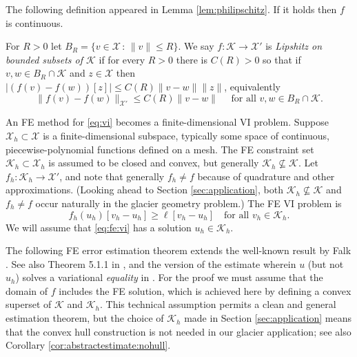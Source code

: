 \documentclass[hidelinks,onefignum,onetabnum,final]{siamart220329}  %
\newcommand{\cK}{\mathcal{K}}
\newcommand{\cX}{\mathcal{X}}
\begin{document}
The following definition appeared in Lemma \ref{lem:philipschitz}.  If it holds then $f$ is continuous.

\begin{definition} \label{def:lipshitz}
For $R>0$ let $B_R = \{v\in \cX\,:\,\|v\|\le R\}$.  We say $f:\cK \to \cX'$ is \emph{Lipshitz on bounded subsets of $\cK$} if for every $R>0$ there is $C(R)>0$ so that if $v,w \in B_R \cap \cK$ and $z\in\cX$ then $|\left(f(v)-f(w)\right)[z]| \le C(R) \|v-w\| \|z\|$, equivalently
\begin{equation}
\|f(v)-f(w)\|_{\cX'} \le C(R) \|v-w\| \quad \text{ for all } v,w \in B_R \cap \cK.  \label{eq:liponbounded}
\end{equation}
\end{definition}

An FE method for \eqref{eq:vi} becomes a finite-dimensional VI problem.  Suppose $\cX_h \subset \cX$ is a finite-dimensional subspace, typically some space of continuous, piecewise-polynomial functions defined on a mesh.  The FE constraint set $\cK_h\subset \cX_h$ is assumed to be closed and convex, but generally $\cK_h \nsubseteq \cK$.  Let $f_h:\cK_h\to\cX'$, and note that generally $f_h\ne f$ because of quadrature and other approximations.  (Looking ahead to Section \ref{sec:application}, both $\cK_h \nsubseteq \cK$ and $f_h\ne f$ occur naturally in the glacier geometry problem.)  The FE VI problem is
\begin{equation}
f_h(u_h)[v_h-u_h] \ge \ell[v_h-u_h] \quad \text{for all } v_h\in \cK_h. \label{eq:fe:vi}
\end{equation}
We will assume that \eqref{eq:fe:vi} has a solution $u_h\in\cK_h$.

The following FE error estimation theorem extends the well-known result by Falk \cite{Falk1974}.  See also Theorem 5.1.1 in \cite{Ciarlet2002}, and the version of the estimate wherein $u$ (but not $u_h$) solves a variational \emph{equality} in \cite[Theorem 1]{KirbyShapero2024}.  For the proof we must assume that the domain of $f$ includes the FE solution, which is achieved here by defining a convex superset of $\cK$ and $\cK_h$.  This technical assumption permits a clean and general estimation theorem, but the choice of $\cK_h$ made in Section \ref{sec:application} means that the convex hull construction is not needed in our glacier application; see also Corollary \ref{cor:abstractestimate:nohull}.
\end{document}
